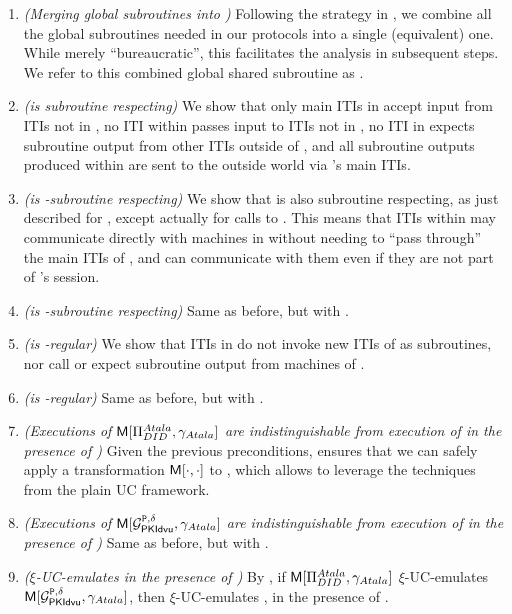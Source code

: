 \begin{enumerate}
\item \emph{(Merging global subroutines into \gAtala)} Following the strategy
  in \cite{bhz21}, we combine all the global subroutines needed in our protocols
  into a single (equivalent) one. While merely ``bureaucratic'', this
  facilitates the analysis in subsequent steps. We refer to this combined
  global shared subroutine as \gAtala.
\item \emph{(\gAtala is subroutine respecting)} We show that only main ITIs
  in \gAtala accept input from ITIs not in \gAtala, no ITI within \gAtala passes
  input to ITIs not in \gAtala, no ITI in \gAtala expects subroutine output from
  other ITIs outside of \gAtala, and all subroutine outputs produced within
  \gAtala are sent to the outside world via \gAtala's main ITIs.
\item \emph{(\RealPKIDIDAtala is \gAtala-subroutine respecting)} We show that
  \RealPKIDIDAtala is also subroutine respecting, as just described for \gAtala,
  except actually for calls to \gAtala. This means that ITIs within
  \RealPKIDIDAtala may communicate directly with machines in \gAtala without
  needing to ``pass through'' the main ITIs of \RealPKIDIDAtala, and can
  communicate with them even if they are not part of \RealPKIDIDAtala's session.
\item \emph{(\IdealGPKIDID is \gAtala-subroutine respecting)} Same as before,
  but with \IdealGPKIDID.
\item \emph{(\gAtala is \RealPKIDIDAtala-regular)} We show that ITIs in \gAtala
  do not invoke new ITIs of \RealPKIDIDAtala as subroutines, nor call or expect
  subroutine output from machines of \RealPKIDIDAtala.
\item \emph{(\gAtala is \IdealGPKIDID-regular)} Same as before, but with
  \IdealGPKIDID.
\item \emph{(Executions of $\mathsf{M}[\Pi_{DID}^{Atala},\gamma_{Atala}]$ are indistinguishable
    from execution of \RealPKIDIDAtala in the presence of \gAtala)} Given the
  previous preconditions, \cite[Proposition 3.4]{bch+20} ensures that we can
  safely apply a transformation $\mathsf{M}[\cdot,\cdot]$ to \RealPKIDIDAtala, which
  allows to leverage the techniques from the plain UC framework.
\item \emph{(Executions of $\mathsf{M}[\mathcal{G}^{\mathtt{P},\delta}_{\mathsf{PKIdvu}},\gamma_{Atala}]$ are indistinguishable
    from execution of \IdealGPKIDID in the presence of \gAtala)} Same as before,
  but with \IdealGPKIDID.
\item \emph{(\RealPKIDIDAtala $\xi$-UC-emulates \IdealGPKIDID in the presence
    of \gAtala)} By \cite[Definition 3.1]{bch+20}, if $\mathsf{M}[\Pi_{DID}^{Atala},
  \gamma_{Atala}]$ $\xi$-UC-emulates $\mathsf{M}[\mathcal{G}^{\mathtt{P},\delta}_{\mathsf{PKIdvu}},\gamma_{Atala}]$, then
  \RealPKIDIDAtala $\xi$-UC-emulates \IdealGPKIDID, in the presence
  of \gAtala.
\end{enumerate}

